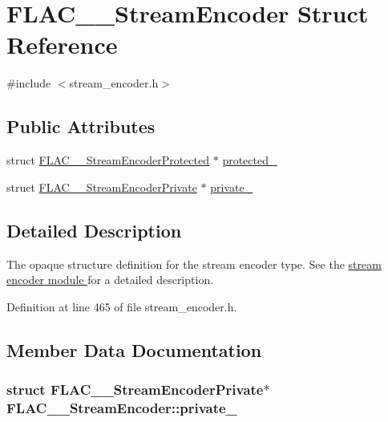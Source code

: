 \hypertarget{struct_f_l_a_c_____stream_encoder}{}\section{F\+L\+A\+C\+\_\+\+\_\+\+Stream\+Encoder Struct Reference}
\label{struct_f_l_a_c_____stream_encoder}


{\ttfamily \#include $<$stream\+\_\+encoder.\+h$>$}

\subsection*{Public Attributes}
\begin{DoxyCompactItemize}
\item 
struct \hyperlink{struct_f_l_a_c_____stream_encoder_protected}{F\+L\+A\+C\+\_\+\+\_\+\+Stream\+Encoder\+Protected} $\ast$ \hyperlink{struct_f_l_a_c_____stream_encoder_a2820d2ad5c6395289b2abc7dc7399f76}{protected\+\_\+}
\item 
struct \hyperlink{struct_f_l_a_c_____stream_encoder_private}{F\+L\+A\+C\+\_\+\+\_\+\+Stream\+Encoder\+Private} $\ast$ \hyperlink{struct_f_l_a_c_____stream_encoder_a6cc84bcaa3049936b459f5f2362b9076}{private\+\_\+}
\end{DoxyCompactItemize}


\subsection{Detailed Description}
The opaque structure definition for the stream encoder type. See the \hyperlink{group__flac__stream__encoder}{stream encoder module } for a detailed description. 

Definition at line 465 of file stream\+\_\+encoder.\+h.



\subsection{Member Data Documentation}
\subsubsection[{\texorpdfstring{private\+\_\+}{private_}}]{\setlength{\rightskip}{0pt plus 5cm}struct {\bf F\+L\+A\+C\+\_\+\+\_\+\+Stream\+Encoder\+Private}$\ast$ F\+L\+A\+C\+\_\+\+\_\+\+Stream\+Encoder\+::private\+\_\+}\hypertarget{struct_f_l_a_c_____stream_encoder_a6cc84bcaa3049936b459f5f2362b9076}{}\label{struct_f_l_a_c_____stream_encoder_a6cc84bcaa3049936b459f5f2362b9076}


